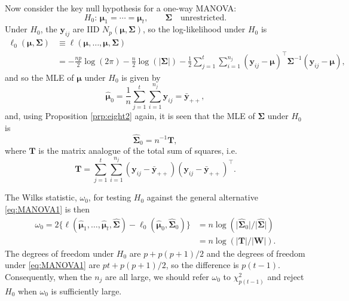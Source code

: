 \documentclass[]{book}
\theoremstyle{definition}
\theoremstyle{definition}
\theoremstyle{definition}
\theoremstyle{remark}
\begin{document}
Now consider the key null hypothesis for a one-way MANOVA:
\[
H_0: \, \boldsymbol \mu_1=\cdots =\boldsymbol \mu_t, \qquad \boldsymbol \Sigma\quad \text{unrestricted}.
\]
Under \(H_0\), the \(\boldsymbol y_{ij}\) are IID \(N_p(\boldsymbol \mu, \boldsymbol \Sigma)\), so the log-likelihood under \(H_0\) is
\begin{align*}
\ell_0(\boldsymbol \mu, \boldsymbol \Sigma) & \equiv \ell (\boldsymbol \mu, \ldots ,\boldsymbol \mu, \boldsymbol \Sigma)\\
&=-\frac{np}{2}\log(2\pi) - \frac{n}{2}\log(\vert \boldsymbol \Sigma\vert)-\frac{1}{2}\sum_{j=1}^t \sum_{i=1}^{n_j} (\boldsymbol y_{ij}-\boldsymbol \mu)^\top \boldsymbol \Sigma^{-1}(\boldsymbol y_{ij}-\boldsymbol \mu),
\end{align*}
and so the MLE of \(\boldsymbol \mu\) under \(H_0\) is given by
\[
\hat{\boldsymbol \mu}_0=\frac{1}{n} \sum_{j=1}^t \sum_{i=1}^{n_j} \boldsymbol y_{ij} =\bar{\boldsymbol y}_{++},
\]
and, using Proposition \ref{prp:eight2} again, it is seen that the MLE of \(\boldsymbol \Sigma\) under \(H_0\) is
\[
\hat{\boldsymbol \Sigma}_0=n^{-1}\boldsymbol T,
\]
where \(\boldsymbol T\) is the matrix analogue of the total sum of squares, i.e.
\[
\boldsymbol T=\sum_{j=1}^t \sum_{i=1}^{n_j} (\boldsymbol y_{ij}-\bar{\boldsymbol y}_{++})(\boldsymbol y_{ij}-\bar{\boldsymbol y}_{++})^\top.
\]

The Wilks statistic, \(\omega_0\), for testing \(H_0\) against the general alternative \eqref{eq:MANOVA1} is then
\begin{align}
\omega_0=2\{\ell(\hat{\boldsymbol \mu}_1, \ldots , \hat{\boldsymbol \mu}_t, \hat{\boldsymbol \Sigma})-\ell_0(\hat{\boldsymbol \mu}_0, \hat{\boldsymbol \Sigma}_0)\}&=n\log \left (\vert \hat{\boldsymbol \Sigma}_0 \vert / \vert \hat{\boldsymbol \Sigma}\vert  \right ) \nonumber \\
&=n \log\left ( \vert \boldsymbol T\vert/\vert \boldsymbol W\vert \right ).
\label{eq:MANOVA2}
\end{align}
The degrees of freedom under \(H_0\) are \(p+p(p+1)/2\) and the degrees of freedom under \eqref{eq:MANOVA1} are \(pt+p(p+1)/2\), so the difference is \(p(t-1)\). Consequently, when the \(n_j\) are all large, we should refer \(\omega_0\) to
\(\chi_{p(t-1)}^2\) and reject \(H_0\) when \(\omega_0\) is sufficiently large.
\end{document}
